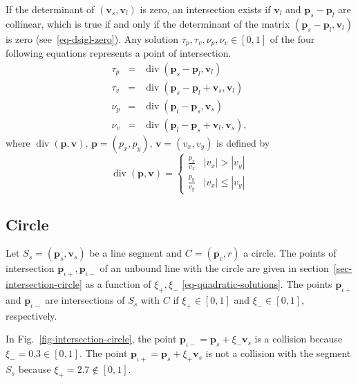 \documentclass[11pt]{article}
\newcommand{\pb}{\mathbf{p}}
\newcommand{\pbc}{\mathbf{p}_c}
\newcommand{\pbl}{\mathbf{p}_l}
\newcommand{\pbs}{\mathbf{p}_s}
\newcommand{\pbiotp}{\mathbf{p}_{\iota+}}
\newcommand{\pbiotm}{\mathbf{p}_{\iota-}}
\newcommand{\vb}{\mathbf{v}}
\newcommand{\vbl}{\mathbf{v}_l}
\newcommand{\vbs}{\mathbf{v}_s}
\DeclareMathOperator{\vecdiv}{div}
\newcommand{\figref}[1]{Fig.~\eqref{#1}}
\begin{document}
If the determinant of $(\vbs,\vbl)$ is zero, an intersection exists if $\vbl$
and $\pbs-\pbl$ are collinear, which is true if and only if the
determinant of the matrix $(\pbs-\pbl,\vbl)$ is zero 
(see~\eqref{eq-dsigl-zero}). Any solution $\tau_p,\tau_v,\nu_p,\nu_v\in[0,1]$ 
of the four following equations represents a point of intersection. 
\begin{eqnarray*}
    \tau_p &=& \vecdiv(\pbs - \pbl, \vbl)\\
    \tau_v &=& \vecdiv(\pbs - \pbl + \vbs, \vbl)\\
    \nu_p &=& \vecdiv(\pbl - \pbs, \vbs)\\
    \nu_v &=& \vecdiv(\pbl - \pbs + \vbl, \vbs),
\end{eqnarray*}
where $\vecdiv(\pb,\vb),\,\pb=(p_x,p_y),\,\vb=(v_x, v_y)$ is defined by
\begin{equation*}
    \vecdiv(\pb, \vb) = \begin{cases}
        \frac{p_x}{v_x} & |v_x| > |v_y| \\
        \frac{p_y}{v_y} & |v_x| \leq |v_y|
    \end{cases}
\end{equation*}



\subsection{Circle}
\label{sec-collision-circle}

Let $S_s=(\pbs,\vbs)$ be a line segment and $C=(\pbc,r)$ a circle. The points
of intersection $\pbiotp,\pbiotm$ of an unbound line with the circle are 
given in section~\ref{sec-intersection-circle} as a function of $\xi_+,\xi_-$
\eqref{eq-quadratic-solutions}. The points $\pbiotp$ and $\pbiotm$ are 
intersections of $S_s$ with $C$ if $\xi_+\in[0,1]$ and $\xi_-\in[0,1]$,
respectively.

In \figref{fig-intersection-circle}, the point $\pbiotm=\pbs+\xi_-\vbs$ is a
collision because $\xi_-=0.3\in[0,1]$. The point $\pbiotp=\pbs+\xi_+\vbs$ is not
a collision with the segment $S_s$ because $\xi_+=2.7\notin[0,1]$.
\end{document}
